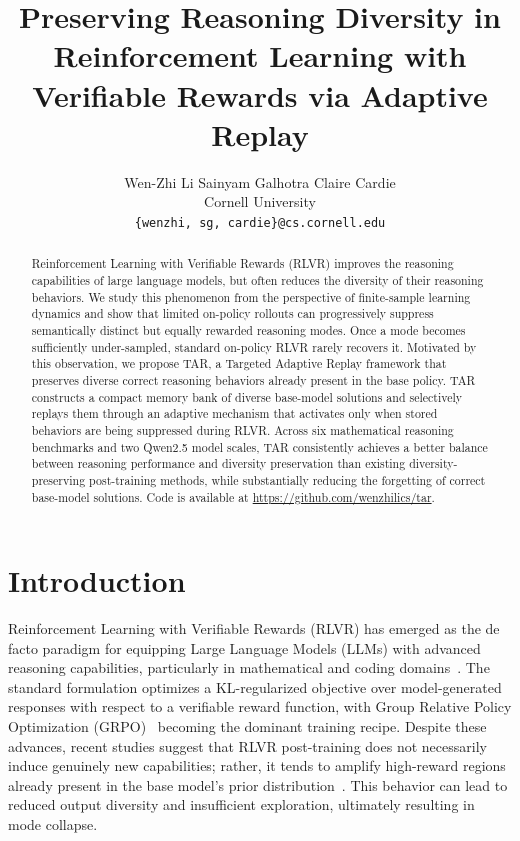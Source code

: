 \documentclass[11pt]{article}
\title{Preserving Reasoning Diversity in Reinforcement Learning with Verifiable Rewards via Adaptive Replay}
\author{Wen-Zhi Li \quad Sainyam Galhotra \quad Claire Cardie \\
  Cornell University \\
  \texttt{\{wenzhi, sg, cardie\}@cs.cornell.edu} \\}
\newcommand{\model}{\textsc{TAR}\xspace}
\begin{document}
\maketitle
\begin{abstract} 
Reinforcement Learning with Verifiable Rewards (RLVR) improves the reasoning capabilities of large language models, but often reduces the diversity of their reasoning behaviors. We study this phenomenon from the perspective of finite-sample learning dynamics and show that limited on-policy rollouts can progressively suppress semantically distinct but equally rewarded reasoning modes. Once a mode becomes sufficiently under-sampled, standard on-policy RLVR rarely recovers it. Motivated by this observation, we propose \model, a Targeted Adaptive Replay framework that preserves diverse correct reasoning behaviors already present in the base policy. \model constructs a compact memory bank of diverse base-model solutions and selectively replays them through an adaptive mechanism that activates only when stored behaviors are being suppressed during RLVR. Across six mathematical reasoning benchmarks and two Qwen2.5 model scales, \model consistently achieves a better balance between reasoning performance and diversity preservation than existing diversity-preserving post-training methods, while substantially reducing the forgetting of correct base-model solutions. Code is available at \url{https://github.com/wenzhilics/tar}.
\end{abstract}

\section{Introduction}

Reinforcement Learning with Verifiable Rewards (RLVR) has emerged as the de facto paradigm for equipping Large Language Models (LLMs) with advanced reasoning capabilities, particularly in mathematical and coding domains~\cite{jaech2024openai, guo2025deepseek, yang2025qwen3}. The standard formulation optimizes a KL-regularized objective over model-generated responses with respect to a verifiable reward function, with Group Relative Policy Optimization (GRPO)~\cite{shao2024deepseekmath} becoming the dominant training recipe.
Despite these advances, recent studies suggest that RLVR post-training does not necessarily induce genuinely new capabilities; rather, it tends to amplify high-reward regions already present in the base model's prior distribution~\cite{yue2025does, wu2025invisible}.
This behavior can lead to reduced output diversity and insufficient exploration, ultimately resulting in mode collapse.
\end{document}
